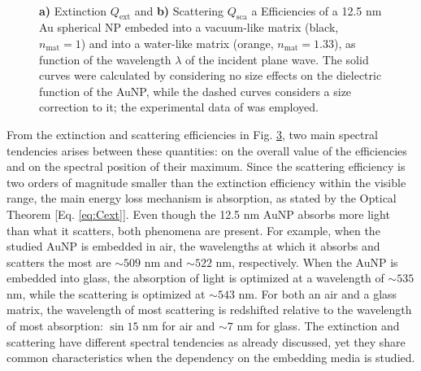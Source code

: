 \begin{figure}[h!]
	\def\svgwidth{1\textwidth} \small
  \vspace*{3.25em}
  \hspace*{-10.75em}
    \begin{subfigure}{.49\textwidth}\caption{ }\label{fig:Mieefficiencies:a}\end{subfigure}
    \begin{subfigure}{.49\textwidth}\caption{ }\label{fig:Mieefficiencies:b}\end{subfigure}
  \vspace*{-6.25em}\\
  \vspace*{-2em}
  \caption[Extinction and Scattering Corss Section of a 12.5 nm Au spherical NP embeded into a vacuum- and into a waterlike environment]{ \textbf{a)} Extinction $Q_\text{ext}$ and \textbf{b)} Scattering $Q_\text{sca}$ a Efficiencies of a 12.5 nm Au spherical NP embeded into a vacuum-like matrix (black, $n_\text{mat} = 1$)  and into a water-like matrix (orange, $n_\text{mat} = 1.33$), as function of  the wavelength $\lambda$ of the incident plane wave.  The solid curves were calculated by considering no size effects on the dielectric function of the AuNP, while the dashed curves considers a size correction to it; the experimental data of \citeauthor{johnson_optical_1972} \cite{johnson_optical_1972} was employed.}
\label{fig:Mieefficiencies}
\end{figure}

From the extinction and scattering efficiencies in Fig. \ref{fig:Mieefficiencies}, two main spectral tendencies arises between these quantities: on the overall value of the efficiencies and on the spectral position of their maximum. Since the scattering efficiency is two orders of magnitude smaller than the extinction efficiency within the visible range, the main energy loss mechanism is absorption, as stated by the Optical Theorem [Eq. \eqref{eq:Cext}]. Even though the 12.5 nm AuNP absorbs more light than what it scatters, both phenomena are present. For example, when the  studied AuNP is embedded in air, the wavelengths at which it absorbs and scatters the most are $\sim 509$ nm and $\sim 522$ nm, respectively. When the AuNP is embedded into glass, the absorption of light is optimized at a wavelength of $\sim 535$ nm, while the scattering is optimized at $\sim 543$ nm. For both an air and a glass matrix, the wavelength of most scattering is redshifted relative to the wavelength of most absorption: $\sin 15$ nm for air and $\sim 7$ nm for glass. The extinction and scattering have different spectral tendencies as already discussed, yet they share common characteristics   when the dependency on the embedding media is studied.

